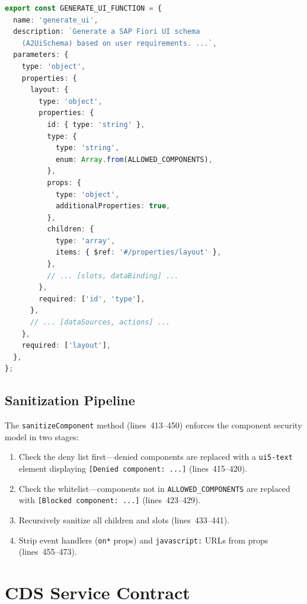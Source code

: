 \documentclass[11pt]{article}
\begin{document}
\begin{lstlisting}[language=TypeScript,caption={GENERATE\_UI\_FUNCTION definition (schema-generator.ts, lines 98--115)},firstnumber=98]
export const GENERATE_UI_FUNCTION = {
  name: 'generate_ui',
  description: `Generate a SAP Fiori UI schema
    (A2UiSchema) based on user requirements. ...`,
  parameters: {
    type: 'object',
    properties: {
      layout: {
        type: 'object',
        properties: {
          id: { type: 'string' },
          type: {
            type: 'string',
            enum: Array.from(ALLOWED_COMPONENTS),
          },
          props: {
            type: 'object',
            additionalProperties: true,
          },
          children: {
            type: 'array',
            items: { $ref: '#/properties/layout' },
          },
          // ... [slots, dataBinding] ...
        },
        required: ['id', 'type'],
      },
      // ... [dataSources, actions] ...
    },
    required: ['layout'],
  },
};
\end{lstlisting}

\subsection{Sanitization Pipeline}

The \texttt{sanitizeComponent} method (lines~413--450) enforces the component
security model in two stages:

\begin{enumerate}
  \item Check the deny list first---denied components are replaced with a
        \texttt{ui5-text} element displaying \texttt{[Denied component: ...]}
        (lines~415--420).
  \item Check the whitelist---components not in \texttt{ALLOWED\_COMPONENTS}
        are replaced with \texttt{[Blocked component: ...]} (lines~423--429).
  \item Recursively sanitize all children and slots (lines~433--441).
  \item Strip event handlers (\texttt{on*} props) and \texttt{javascript:}
        URLs from props (lines~455--473).
\end{enumerate}

\section{CDS Service Contract}
\label{sec:cds-contract}
\end{document}
